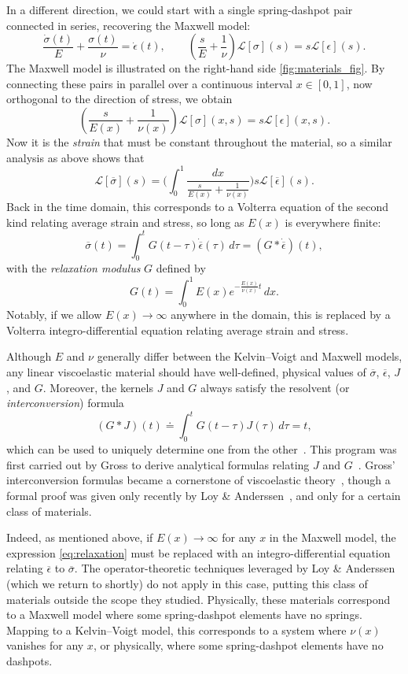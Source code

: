 \documentclass{cams-l} %
\newcommand{\dave}[1]{#1}\newcommand{\davebegin}{}\newcommand{\daveend}{}\newcommand{\george}[1]{#1}
\newcommand{\cL}{\mathcal L}
\newcommand{\ovl}[1]{{\overline{#1}}}
\theoremstyle{definition}
\theoremstyle{remark}
\numberwithin{equation}{section}
\begin{document}
In a different direction, we could start with a single spring-dashpot pair connected in series, recovering the Maxwell model:
\[\frac{\dot{\sigma}(t)}{E} + \frac{\sigma(t)}{\nu} = \dot{\epsilon}(t),\qquad \left(\frac{s}{E}+\frac{1}{\nu}\right)\cL[\sigma](s) = s\cL[\epsilon](s).\]
The Maxwell model is illustrated on the right-hand side \cref{fig:materials_fig}. By connecting these pairs in parallel over a continuous interval $x\in[0,1]$, now orthogonal to the direction of stress, we obtain
\[\left(\frac{s}{E(x)} + \frac{1}{\nu(x)}\right)\cL[\sigma](x, s) = s\cL[\epsilon](x, s).\]
Now it is the \emph{strain} that must be constant throughout the material, so a similar analysis as above shows that
\[\cL[\overline{\sigma}](s) = \Big(\int_0^1\frac{dx}{\frac{s}{E(x)} + \frac{1}{\nu(x)}}\Big)s\cL[\overline{\epsilon}](s).\]
Back in the time domain, this corresponds to a {Volterra equation of the second kind} relating average strain and stress, so long as $E(x)$ is everywhere finite:
\[\ovl{\sigma}(t) = \int_0^t G(t-\tau)\dot{\ovl{\epsilon}}(\tau)\,d\tau = (G*\dot{\ovl{\epsilon}})(t),\]
with the \emph{relaxation modulus} $G$ defined by
\begin{equation}\label{eq:relaxation}
    G(t) = \int_0^1 E(x)e^{-\frac{E(x)}{\nu(x)}t}\,dx.
\end{equation}
Notably, if we allow $E(x) \to \infty$ anywhere in the domain, this is replaced by a Volterra integro-differential equation relating average strain and stress.

Although $E$ and $\nu$ generally differ between the Kelvin--Voigt and Maxwell models, any linear viscoelastic material should have well-defined, physical values of $\ovl{\sigma}$, $\ovl{\epsilon}$, $J$, and $G$. Moreover, the kernels $J$ and $G$ always satisfy the resolvent (or \emph{interconversion}) formula
\[(G*J)(t) \doteq \int_0^t G(t-\tau)J(\tau)\,d\tau = t,\]
which can be used to uniquely determine one from the other~\cite{ferry1980viscoelastic}. This program was first carried out by Gross to derive analytical formulas relating $J$ and $G$~\cite{gross1952inversion,gross1968mathematical}. Gross' interconversion formulas became a cornerstone of viscoelastic theory~\cite{ferry1980viscoelastic,mainardi2022fractional}, though a formal proof was given only recently by Loy \& Anderssen~\cite{loy_anderssen}, and only for a certain class of materials.

Indeed, as mentioned above, if $E(x)\to\infty$ for any $x$ in the Maxwell model, the expression \cref{eq:relaxation} must be replaced with an integro-differential equation relating $\ovl{\epsilon}$ to $\ovl{\sigma}$. The operator-theoretic techniques leveraged by Loy \& Anderssen (which we return to shortly) do not apply in this case, putting this class of materials outside the scope they studied. Physically, these materials correspond to a Maxwell model where some spring-\dave{dashpot} elements have no springs. Mapping to a Kelvin--Voigt model, this corresponds to a system where $\nu(x)$ vanishes for any $x$, or physically, where some spring-\dave{dashpot} elements have no \dave{dashpots}.
\end{document}
